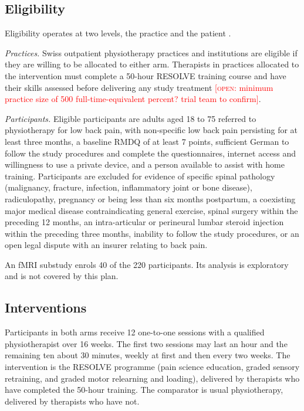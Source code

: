 \documentclass[11pt,a4paper]{article}
\newcommand{\open}[1]{\textcolor{red}{[\textsc{open}: #1]}}
\begin{document}
\subsection{Eligibility}
\label{sec:eligibility}

Eligibility operates at two levels, the practice and the patient
\citep{campbell2012}.

\emph{Practices.} Swiss outpatient physiotherapy practices and institutions
are eligible if they are willing to be allocated to either arm. Therapists in practices allocated to the
intervention must complete a 50-hour RESOLVE training course and have their
skills assessed before delivering any study treatment
\open{minimum practice size of 500 full-time-equivalent percent? trial team
to confirm}.

\emph{Participants.} Eligible participants are adults aged 18 to 75 referred
to physiotherapy for low back pain, with non-specific low back pain persisting for at least three
months, a baseline RMDQ of at least 7 points, sufficient German to follow the
study procedures and complete the questionnaires, internet access and
willingness to use a private device, and a person available to assist with home
training. Participants are excluded for evidence of specific spinal pathology
(malignancy, fracture, infection, inflammatory joint or bone disease),
radiculopathy, pregnancy or being less than six months postpartum, a coexisting
major medical disease contraindicating general exercise, spinal surgery within
the preceding 12 months, an intra-articular or perineural lumbar steroid
injection within the preceding three months, inability to follow the study
procedures, or an open legal dispute with an insurer relating to back pain.

An fMRI substudy enrols 40 of the 220 participants. Its analysis is exploratory
and is not covered by this plan.

\subsection{Interventions}

Participants in both arms receive 12 one-to-one sessions with a qualified
physiotherapist over 16 weeks. The first two sessions may last an hour and the
remaining ten about 30 minutes, weekly at first and then every two weeks. The
intervention is the RESOLVE programme (pain science education, graded sensory
retraining, and graded motor relearning and loading), delivered by therapists
who have completed the 50-hour training. The comparator is usual
physiotherapy, delivered by therapists who have not.
\end{document}
